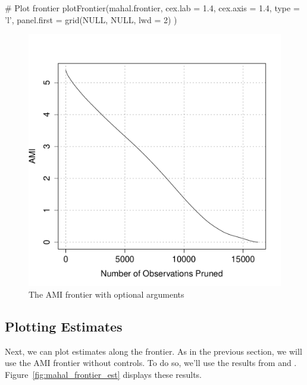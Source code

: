 \documentclass[nojss]{jss}
\begin{document}
\begin{minipage}{0.45\textwidth}
\begin{CodeChunk}
\begin{CodeInput}
# Plot frontier
plotFrontier(mahal.frontier,
             cex.lab = 1.4,
             cex.axis = 1.4,
             type = 'l',
             panel.first = 
                grid(NULL, 
                     NULL, 
                     lwd = 2)
             )
\end{CodeInput}
\end{CodeChunk}
\end{minipage}
\begin{minipage}{0.5\textwidth}
\begin{figure}[H]
\includegraphics{mahal_frontier_pretty.pdf}
\caption{\label{fig:mahal_frontier_pretty} The AMI frontier with optional arguments}
\end{figure}
\end{minipage} \hfill
\newline
\newline
\vspace

\subsection{Plotting Estimates}

Next, we can plot estimates along the frontier. As in the previous
section, we will use the AMI frontier without controls. To do so,
we'll use the results from  and
. Figure~\ref{fig:mahal_frontier_est} displays these
results.
\end{document}
